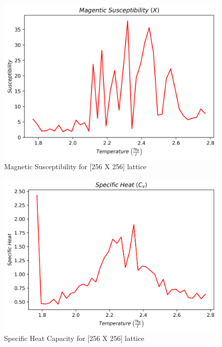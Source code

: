 \documentclass[twocolumn]{article}
\begin{document}
\begin{figure}[H]
\caption{Magnetic Susceptibility for [256 X 256] lattice}
\centering
\includegraphics[scale=.45]{MagSuscept256}
\end{figure}
\begin{figure}[h]
\caption{Specific Heat Capacity for [256 X 256] lattice}
\centering
\includegraphics[scale=.45]{SpecificHeat256}
\end{figure}
\end{document}
